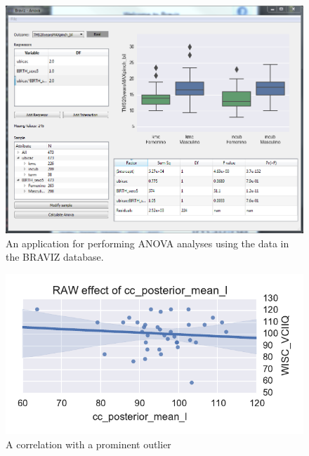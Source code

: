 \documentclass[twocolumn]{svjour3}
\begin{document}
\begin{figure}
\begin{center}
\includegraphics[width=\linewidth]{anova.PNG}
\end{center}
 \caption{\label{fig_anova}An application for performing ANOVA analyses using the data in the BRAVIZ database.}
\end{figure}

\begin{figure}
\begin{center}
\includegraphics[width=\linewidth]{initial_corr}
\end{center}
 \caption{\label{fig_lm}A correlation with a prominent outlier}
\end{figure}
\end{document}
